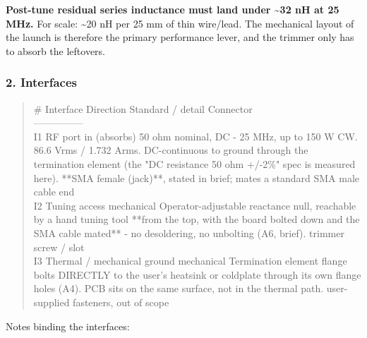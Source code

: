\documentclass[11pt,a4paper]{article}
\begin{document}
\textbf{Post-tune residual series inductance must land under \textasciitilde{}32 nH at 25 MHz.} For scale: \textasciitilde{}20 nH per 25 mm of thin wire/lead. The mechanical layout of the launch is therefore the primary performance lever, and the trimmer only has to absorb the leftovers.

\subsubsection*{2. Interfaces}
\begin{quote}\small\ttfamily\raggedright
\textbar{} \# \textbar{} Interface \textbar{} Direction \textbar{} Standard / detail \textbar{} Connector \textbar{}\\
\textbar{}---\textbar{}---\textbar{}---\textbar{}---\textbar{}---\textbar{}\\
\textbar{} I1 \textbar{} RF port \textbar{} in (absorbs) \textbar{} 50 ohm nominal, DC - 25 MHz, up to 150 W CW. 86.6 Vrms / 1.732 Arms. DC-continuous to ground through the termination element (the "DC resistance 50 ohm +/-2\%" spec is measured here). \textbar{} {*}{*}SMA female (jack){*}{*}, stated in brief; mates a standard SMA male cable end \textbar{}\\
\textbar{} I2 \textbar{} Tuning access \textbar{} mechanical \textbar{} Operator-adjustable reactance null, reachable by a hand tuning tool {*}{*}from the top, with the board bolted down and the SMA cable mated{*}{*} - no desoldering, no unbolting (A6, brief). \textbar{} trimmer screw / slot \textbar{}\\
\textbar{} I3 \textbar{} Thermal / mechanical ground \textbar{} mechanical \textbar{} Termination element flange bolts DIRECTLY to the user's heatsink or coldplate through its own flange holes (A4). PCB sits on the same surface, not in the thermal path. \textbar{} user-supplied fasteners, out of scope \textbar{}
\end{quote}
Notes binding the interfaces:
\end{document}
